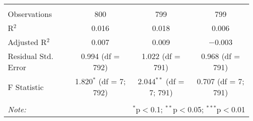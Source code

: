 \begin{table}[!htbp]
\begin{tabular}{@{\extracolsep{5pt}}lccc}
  & & & \\ 
\hline \\[-1.8ex] 
Observations & 800 & 799 & 799 \\ 
R$^{2}$ & 0.016 & 0.018 & 0.006 \\ 
Adjusted R$^{2}$ & 0.007 & 0.009 & $-$0.003 \\ 
Residual Std. Error & 0.994 (df = 792) & 1.022 (df = 791) & 0.968 (df = 791) \\ 
F Statistic & 1.820$^{*}$ (df = 7; 792) & 2.044$^{**}$ (df = 7; 791) & 0.707 (df = 7; 791) \\ 
\hline 
\hline \\[-1.8ex] 
\textit{Note:}  & \multicolumn{3}{r}{$^{*}$p$<$0.1; $^{**}$p$<$0.05; $^{***}$p$<$0.01} \\ 
\end{tabular} 
\end{table} 
